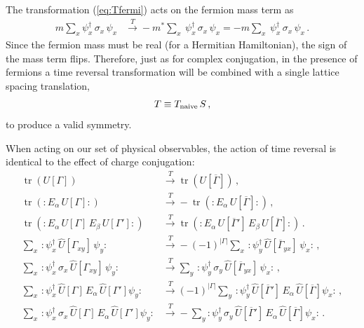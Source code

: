 \documentclass [12pt]{article}
\newcommand{\tr}{\mathop{\mathrm{tr}}}
\begin{document}
The transformation (\ref{eq:Tfermi}) acts on
the fermion mass term as
\begin{align}
    m \sum_x
    \psi_x^\dagger \, \sigma_x \, \psi_x
    &\xrightarrow{T}
    -m^* \sum_x \>
    \psi_x^\dagger \, \sigma_x \, \psi_x
    =
    -m \sum_x \>
    \psi_x^\dagger \, \sigma_x \, \psi_x \,.
\end{align}
Since the fermion mass must be real (for a Hermitian Hamiltonian),
the sign of the mass term flips.
Therefore, just as for complex conjugation, in the presence of
fermions a time reversal transformation will be combined with a single
lattice spacing translation,
\begin{align}
    T \equiv T_{\rm naive} \, S \,,
\end{align}
to produce a valid symmetry.

When acting on our set of physical observables, the action
of time reversal is identical to the effect of charge conjugation:
\begin{subequations}\label{eq:Ttrans}
\begin{align}
    \tr(U[\Gamma])
    &\xrightarrow{T}
    \tr(U[\overline\Gamma]) \,,
\\[3pt]
    \tr({:}E_\alpha \, U[\Gamma]{:})
    &\xrightarrow{T}
    -\tr({:}E_\alpha \, U[\overline\Gamma]{:}) \,,
\\[3pt]
    \tr({:}E_\alpha \, U[\Gamma] \, E_\beta \, U[\Gamma']{:})
    &\xrightarrow{T}
    \tr({:}E_\alpha \, U[\overline\Gamma'] \, E_\beta \, U[\overline\Gamma]{:}) \,.
\\[5pt]
    \sum_x \,
    {:} \psi_x^\dagger \, \hat U[\Gamma_{xy}] \, \psi_y {:}
    &\xrightarrow{T}
    -(-1)^{|\Gamma|}
    \sum_x \,
    {:} \psi_y^\dagger \, \hat U[\overline\Gamma_{yx}] \,
	\psi_x {:} \,,
\\
    \sum_x \,
    {:} \psi_x^\dagger \, \sigma_x \, \hat U[\Gamma_{xy}] \, \psi_y {:}
    &\xrightarrow{T}
    \sum_y \,
    {:} \psi_y^\dagger \, \sigma_y \, \hat U[\overline\Gamma_{yx}] \,
	\psi_x {:} \,,
\\
    \sum_x \,
    {:} \psi_x^\dagger \, \hat U[\Gamma] \, E_\alpha \, \hat U[\Gamma'] \psi_y {:}
    &\xrightarrow{T}
    (-1)^{|\Gamma|}
    \sum_y \,
    {:} \psi_y^\dagger \, \hat U[\overline\Gamma'] \,
	E_\alpha \, \hat U[\overline\Gamma] \psi_x {:} \,,
\\
    \sum_x \,
    {:} \psi_x^\dagger \, \sigma_x \, \hat U[\Gamma] \, E_\alpha \, \hat U[\Gamma'] \psi_y {:}
    &\xrightarrow{T}
    -\sum_y
    {:} \psi_y^\dagger \, \sigma_y \, \hat U[\overline\Gamma'] \,
	E_\alpha \, \hat U[\overline\Gamma] \psi_x {:} \,.
\end{align}
\end{subequations}
\end{document}
